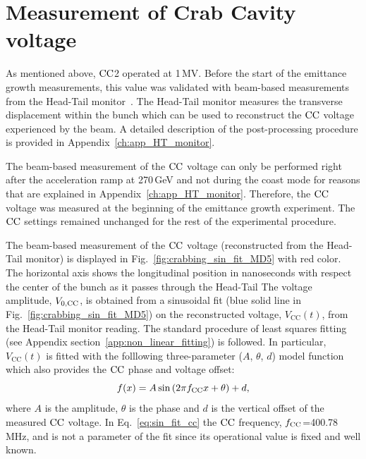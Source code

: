 \section{Measurement of Crab Cavity voltage}\label{subsec:CC_voltage_2018_measurement}
As mentioned above, ${\mathrm{CC}}$2 operated at 1\,MV. Before the start of the emittance growth measurements, this value was validated with beam-based measurements from the Head-Tail monitor~\cite{sps_headtail_monitor}. The Head-Tail monitor measures the transverse displacement within the bunch which can be used to reconstruct the ${\mathrm{CC}}$ voltage experienced by the beam. A detailed description of the post-processing procedure is provided in Appendix~\ref{ch:app_HT_monitor}.

The beam-based measurement of the ${\mathrm{CC}}$ voltage can only be performed right after the acceleration ramp at 270\,GeV and not during the coast mode for reasons that are explained in Appendix~\ref{ch:app_HT_monitor}. Therefore, the ${\mathrm{CC}}$ voltage was measured at the beginning of the emittance growth experiment.%
 The ${\mathrm{CC}}$ settings remained unchanged for the rest of the experimental procedure.

The beam-based measurement of the ${\mathrm{CC}}$ voltage (reconstructed from the Head-Tail monitor) is displayed in Fig.~\ref{fig:crabbing_sin_fit_MD5} with red color. The horizontal axis shows the longitudinal position in nanoseconds with respect the center of the bunch as it passes through the Head-Tail The voltage amplitude, ${V_\mathrm{0, CC}}$, is obtained from a sinusoidal fit (blue solid line in Fig.~\ref{fig:crabbing_sin_fit_MD5}) on the reconstructed voltage, $V_\mathrm{CC}(t)$, from the Head-Tail monitor reading. The standard procedure of least squares fitting (see Appendix section~\ref{app:non_linear_fitting}) is followed. In particular, $V_\mathrm{CC}(t)$ is fitted with the folllowing three-parameter ($A$, $\theta$, $d$) model function which also provides the ${\mathrm{CC}}$ phase and voltage offset:
\begin{equation}\label{eq:sin_fit_cc}
   f(x) = A \sin{(2\pi {f_\mathrm{CC}}x + \theta)} + d ,
\end{equation}
where $A$ is the amplitude, $\theta$ is the phase and $d$ is the vertical offset of the measured ${\mathrm{CC}}$ voltage. In Eq.~\eqref{eq:sin_fit_cc} the ${\mathrm{CC}}$ frequency, ${f_\mathrm{CC}}$=400.78\,MHz, and is not a parameter of the fit since its operational value is fixed and well known.


